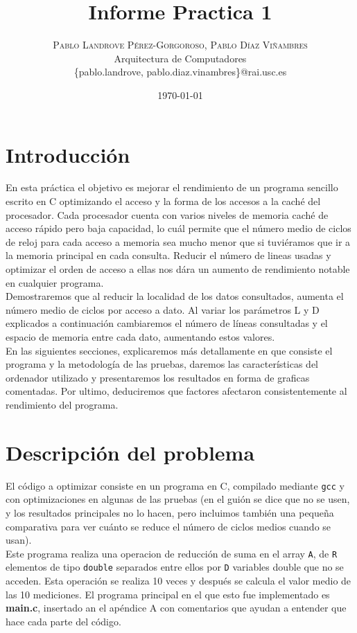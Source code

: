 \documentclass[a4paper,twocolumn]{article}
\title{Informe Practica 1} %
\author{%
	\textsc{Pablo Landrove Pérez-Gorgoroso, Pablo Díaz Viñambres} \\[1ex] %
	\normalsize Arquitectura de Computadores\\
	\normalsize \{pablo.landrove, pablo.diaz.vinambres\}@rai.usc.es %
}
\date{\today} %
\begin{document}
	
	\maketitle
	
	
	\section{Introducción}
	
	En esta práctica el objetivo es mejorar el rendimiento de un programa sencillo escrito en C optimizando el acceso y la forma de los accesos a la caché del procesador.	Cada procesador cuenta con varios niveles de memoria caché de acceso rápido pero baja capacidad, lo cuál permite que el número medio de ciclos de reloj para cada acceso a memoria sea mucho menor que si tuviéramos que ir a la memoria principal en cada consulta. Reducir el número de lineas usadas y optimizar el orden de acceso a ellas nos dára un aumento de rendimiento notable en cualquier programa. \\
	
	Demostraremos que al reducir la localidad de los datos consultados, aumenta el número medio de ciclos por acceso a dato. Al variar los parámetros L y D explicados a continuación cambiaremos el número de líneas consultadas y el espacio de memoria entre cada dato, aumentando estos valores. \\
	
	En las siguientes secciones, explicaremos más detallamente en que consiste el programa y la metodología de las pruebas, daremos las características del ordenador utilizado y presentaremos los resultados en forma de graficas comentadas. Por ultimo, deduciremos que factores afectaron consistentemente al rendimiento del programa. \\
	
	\section{Descripción del problema}
	El código a optimizar consiste en un programa en C, compilado mediante \texttt{gcc} y con optimizaciones en algunas de las pruebas (en el guión se dice que no se usen, y los resultados principales no lo hacen, pero incluimos también una pequeña comparativa para ver cuánto se reduce el número de ciclos medios cuando se usan). \\
	Este programa realiza una operacion de reducción de suma en el array \texttt{A}, de \texttt{R} elementos de tipo \texttt{double} separados entre ellos por \texttt{D} variables double que no se acceden. Esta operación se realiza 10 veces y después se calcula el valor medio de las 10 mediciones. El programa principal en el que esto fue implementado es \textbf{main.c}, insertado an el apéndice A con comentarios que ayudan a entender que hace cada parte del código. \\
	\newpage
\end{document}
